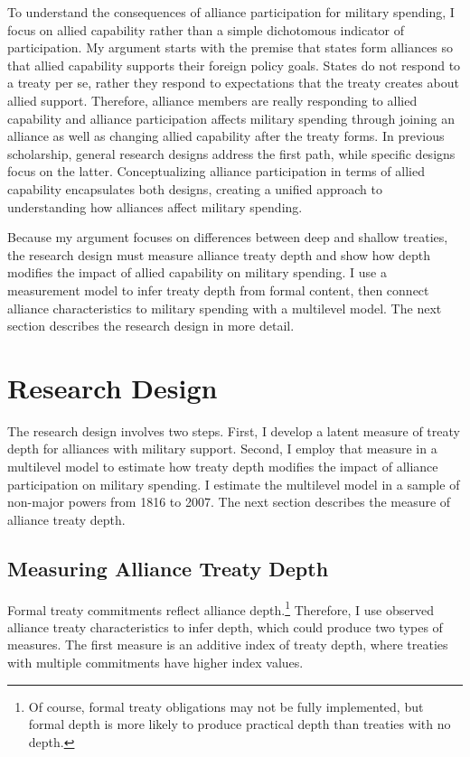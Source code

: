 \documentclass[12pt]{article}
\begin{document}
To understand the consequences of alliance participation for military spending, I focus on allied capability rather than a simple dichotomous indicator of participation.
My argument starts with the premise that states form alliances so that allied capability supports their foreign policy goals. 
States do not respond to a treaty per se, rather they respond to expectations that the treaty creates about allied support. 
Therefore, alliance members are really responding to allied capability and alliance participation affects military spending through joining an alliance as well as changing allied capability after the treaty forms. 
In previous scholarship, general research designs address the first path, while specific designs focus on the latter. 
Conceptualizing alliance participation in terms of allied capability encapsulates both designs, creating a unified approach to understanding how alliances affect military spending. 


Because my argument focuses on differences between deep and shallow treaties, the research design must measure alliance treaty depth and show how depth modifies the impact of allied capability on military spending.  
I use a measurement model to infer treaty depth from formal content, then connect alliance characteristics to military spending with a multilevel model. 
The next section describes the research design in more detail. 



\section{Research Design} 


The research design involves two steps. 
First, I develop a latent measure of treaty depth for alliances with military support. 
Second, I employ that measure in a multilevel model to estimate how treaty depth modifies the impact of alliance participation on military spending. 
I estimate the multilevel model in a sample of non-major powers from 1816 to 2007. 
The next section describes the measure of alliance treaty depth. 


\subsection{Measuring Alliance Treaty Depth} 


Formal treaty commitments reflect alliance depth.\footnote{Of course, formal treaty obligations may not be fully implemented, but formal depth is more likely to produce practical depth than treaties with no depth.}
Therefore, I use observed alliance treaty characteristics to infer depth, which could produce two types of measures. 
The first measure is an additive index of treaty depth, where treaties with multiple commitments have higher index values. 
\end{document}

